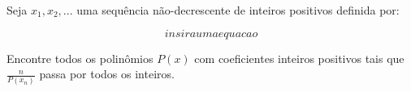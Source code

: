 Seja $x_1, x_2, ...$ uma sequência não-decrescente de inteiros positivos definida por:

\[insira uma equacao\]

Encontre todos os polinômios $P(x)$ com coeficientes inteiros positivos tais que $\frac{n}{P(x_n)}$ passa por todos os inteiros.
